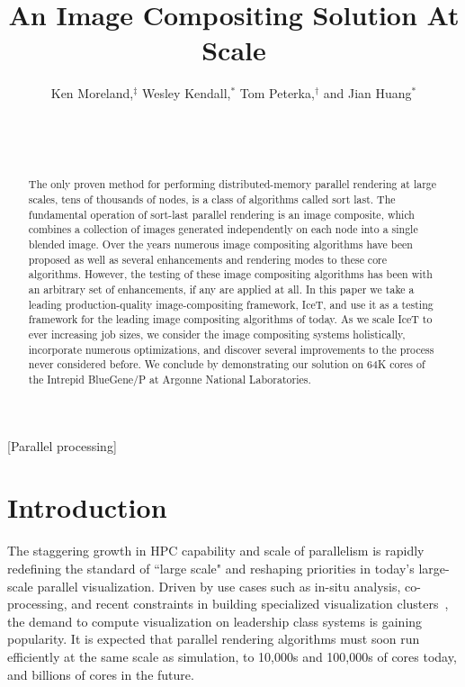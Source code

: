 \documentclass{sig-alternate}
\title{An Image Compositing Solution At Scale}
\author{
\alignauthor
Ken Moreland,$^{\ddagger}$ Wesley Kendall,$^{*}$ Tom Peterka,$^{\dagger}$ and Jian Huang$^{*}$\\
    \affaddr{$^\ddagger$Sandia National Laboratory}\\
    \affaddr{$^*$University of Tennessee, Knoxville}\\
    \affaddr{$^\dagger$Argonne National Laboratory}\\
}
\newcommand*{\lcite}[1]{~\cite{#1}}
\begin{document}
\sloppy

\maketitle

\begin{abstract}
  The only proven method for performing distributed-memory parallel
  rendering at large scales, tens of thousands of nodes, is a class of
  algorithms called sort last.  The fundamental operation of sort-last
  parallel rendering is an image composite, which combines a collection of
  images generated independently on each node into a single blended image.
  Over the years numerous image compositing algorithms have been proposed
  as well as several enhancements and rendering modes to these core
  algorithms.  However, the testing of these image compositing algorithms
  has been with an arbitrary set of enhancements, if any are applied at
  all.  In this paper we take a leading production-quality
  image-compositing framework, IceT, and use it as a testing framework for
  the leading image compositing algorithms of today.  As we scale IceT to
  ever increasing job sizes, we consider the image compositing systems
  holistically, incorporate numerous optimizations, and discover several
  improvements to the process never considered before.  We conclude by
  demonstrating our solution on 64K cores of the Intrepid BlueGene/P at
  Argonne National Laboratories.
\end{abstract}


[Parallel processing]


\section{Introduction} 
\label{sec:Introduction}

The staggering growth in HPC capability and scale of parallelism is rapidly 
redefining the standard of ``large scale" and reshaping priorities 
in today's large-scale parallel visualization.
Driven by use cases such as in-situ analysis, co-processing, and
recent constraints in building specialized visualization 
clusters\lcite{Childs2007}, the demand to compute visualization 
on leadership class systems is gaining popularity.
It is expected that parallel rendering algorithms must soon run efficiently 
at the same scale as simulation, to 10,000s and 100,000s of cores 
today, and billions of cores in the future.
\end{document}
